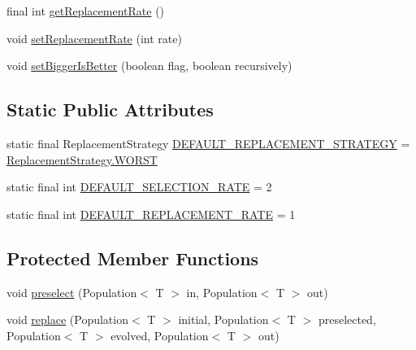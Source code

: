 \begin{DoxyCompactItemize}
\item 
final int \hyperlink{classjenes_1_1stage_1_1operator_1_1common_1_1_steady_state_3_01_t_01extends_01_chromosome_01_4_a32b13dd16c8bb611085477f02bc23cfc}{get\-Replacement\-Rate} ()
\item 
void \hyperlink{classjenes_1_1stage_1_1operator_1_1common_1_1_steady_state_3_01_t_01extends_01_chromosome_01_4_a8e504ea91d2e2c18fefa54042388e188}{set\-Replacement\-Rate} (int rate)
\item 
void \hyperlink{classjenes_1_1stage_1_1operator_1_1common_1_1_steady_state_3_01_t_01extends_01_chromosome_01_4_a4aaac6d7b52c8d107b98ab9170a14715}{set\-Bigger\-Is\-Better} (boolean flag, boolean recursively)
\end{DoxyCompactItemize}
\subsection*{Static Public Attributes}
\begin{DoxyCompactItemize}
\item 
static final Replacement\-Strategy \hyperlink{classjenes_1_1stage_1_1operator_1_1common_1_1_steady_state_3_01_t_01extends_01_chromosome_01_4_a4ed786deaaaefebd47fffc18e99b3710}{D\-E\-F\-A\-U\-L\-T\-\_\-\-R\-E\-P\-L\-A\-C\-E\-M\-E\-N\-T\-\_\-\-S\-T\-R\-A\-T\-E\-G\-Y} = \hyperlink{enumjenes_1_1stage_1_1operator_1_1common_1_1_steady_state_3_01_t_01extends_01_chromosome_01_4_1_1_replacement_strategy_a7cc73c0ae9c2f979dc4bb8aa9000582e}{Replacement\-Strategy.\-W\-O\-R\-S\-T}
\item 
static final int \hyperlink{classjenes_1_1stage_1_1operator_1_1common_1_1_steady_state_3_01_t_01extends_01_chromosome_01_4_a9d6bcfbcf1911ce2936e782e96919ebd}{D\-E\-F\-A\-U\-L\-T\-\_\-\-S\-E\-L\-E\-C\-T\-I\-O\-N\-\_\-\-R\-A\-T\-E} = 2
\item 
static final int \hyperlink{classjenes_1_1stage_1_1operator_1_1common_1_1_steady_state_3_01_t_01extends_01_chromosome_01_4_a9700692d577e24267d1105f2a6e3d379}{D\-E\-F\-A\-U\-L\-T\-\_\-\-R\-E\-P\-L\-A\-C\-E\-M\-E\-N\-T\-\_\-\-R\-A\-T\-E} = 1
\end{DoxyCompactItemize}
\subsection*{Protected Member Functions}
\begin{DoxyCompactItemize}
\item 
void \hyperlink{classjenes_1_1stage_1_1operator_1_1common_1_1_steady_state_3_01_t_01extends_01_chromosome_01_4_a4cc6031dfce1f23a49dfb6270be45358}{preselect} (Population$<$ T $>$ in, Population$<$ T $>$ out)
\item 
void \hyperlink{classjenes_1_1stage_1_1operator_1_1common_1_1_steady_state_3_01_t_01extends_01_chromosome_01_4_aedd46a5fd49b71554354612f991c1482}{replace} (Population$<$ T $>$ initial, Population$<$ T $>$ preselected, Population$<$ T $>$ evolved, Population$<$ T $>$ out)
\end{DoxyCompactItemize}

